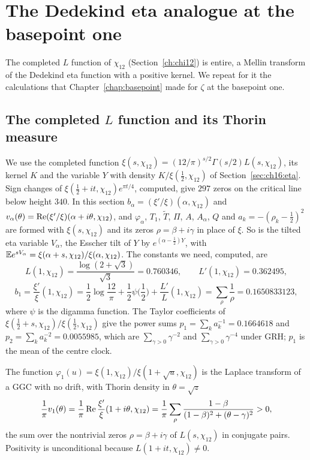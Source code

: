 \section{The Dedekind eta analogue at the basepoint one}\label{ch:bpeta}

The completed $L$ function of $\chi_{12}$ (Section~\ref{ch:chi12}) is entire, a Mellin transform of the Dedekind eta function with a positive kernel. We repeat for it the calculations that Chapter~\ref{chap:basepoint} made for $\zeta$ at the basepoint one.

\subsection{The completed \texorpdfstring{$L$}{L} function and its Thorin measure}\label{bp:eta:sec}

We use the completed function $\xi(s,\chi_{12})=(12/\pi)^{s/2}\Gamma(s/2)L(s,\chi_{12})$, its kernel $K$ and the variable $Y$ with density $K/\xi(\frac12,\chi_{12})$ of Section~\ref{sec:ch16:eta}. Sign changes of $\xi(\frac12+it,\chi_{12})e^{\pi t/4}$, computed, give $297$ zeros on the critical line below height $340$. In this section $b_\alpha=(\xi'/\xi)(\alpha,\chi_{12})$ and $v_\alpha(\theta)=\operatorname{Re}(\xi'/\xi)(\alpha+i\theta,\chi_{12})$, and $\varphi_\alpha$, $T_1$, $\widetilde T$, $\Pi$, $A$, $A_\alpha$, $Q$ and $a_k=-(\rho_k-\frac12)^2$ are formed with $\xi(s,\chi_{12})$ and its zeros $\rho=\beta+i\gamma$ in place of $\xi$. So is the tilted eta variable $V_\alpha$, the Esscher tilt of $Y$ by $e^{(\alpha-\frac12)Y}$, with $\mathbb{E} e^{sV_\alpha}=\xi(\alpha+s,\chi_{12})/\xi(\alpha,\chi_{12})$. The constants we need, computed, are
\[
L(1,\chi_{12})=\frac{\log(2+\sqrt3)}{\sqrt3}=0.760346,\qquad L'(1,\chi_{12})=0.362495,
\]
\[
b_1=\frac{\xi'}{\xi}(1,\chi_{12})=\frac12\log\frac{12}\pi+\frac12\psi\Big(\frac12\Big)+\frac{L'}{L}(1,\chi_{12})=\sum_\rho\frac1\rho=0.1650833123,
\]
where $\psi$ is the digamma function. The Taylor coefficients of $\xi(\frac12+s,\chi_{12})/\xi(\frac12,\chi_{12})$ give the power sums $p_1=\sum_ka_k^{-1}=0.1664618$ and $p_2=\sum_ka_k^{-2}=0.0055985$, which are $\sum_{\gamma>0}\gamma^{-2}$ and $\sum_{\gamma>0}\gamma^{-4}$ under GRH; $p_1$ is the mean of the centre clock.

\label{bp:eta:sec:thorin}

\begin{proposition}\label{bp:eta:prop:thorin}
The function $\varphi_1(u)=\xi(1,\chi_{12})/\xi(1+\sqrt u,\chi_{12})$ is the Laplace transform of a GGC with no drift, with Thorin density in $\theta=\sqrt z$
\[
\frac1\pi v_1(\theta)=\frac1\pi\operatorname{Re}\frac{\xi'}{\xi}(1+i\theta,\chi_{12})=\frac1\pi\sum_\rho\frac{1-\beta}{(1-\beta)^2+(\theta-\gamma)^2}>0,
\]
the sum over the nontrivial zeros $\rho=\beta+i\gamma$ of $L(s,\chi_{12})$ in conjugate pairs. Positivity is unconditional because $L(1+it,\chi_{12})\ne0$.
\end{proposition}

